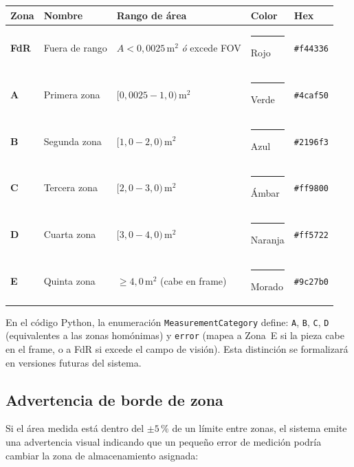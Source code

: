 \documentclass[12pt, a4paper]{article}
\begin{document}
\vspace{0.5cm}
\begin{center}
\begin{tabular}{p{1.1cm} p{2.5cm} p{3.8cm} p{2.4cm} p{1.8cm}}
\toprule
\textbf{Zona} & \textbf{Nombre} & \textbf{Rango de área} & \textbf{Color} & \textbf{Hex} \\
\midrule
\textbf{FdR} & Fuera de rango &
  $A < 0{,}0025\,\text{m}^2$ \textit{ó} excede FOV &
  \textcolor{catOut}{\rule{1.2cm}{0.25cm}} Rojo & \texttt{\#f44336} \\[3pt]
\textbf{A} & Primera zona &
  $[0{,}0025 - 1{,}0)\,\text{m}^2$ &
  \textcolor{catA}{\rule{1.2cm}{0.25cm}} Verde & \texttt{\#4caf50} \\[3pt]
\textbf{B} & Segunda zona &
  $[1{,}0 - 2{,}0)\,\text{m}^2$ &
  \textcolor{catB}{\rule{1.2cm}{0.25cm}} Azul & \texttt{\#2196f3} \\[3pt]
\textbf{C} & Tercera zona &
  $[2{,}0 - 3{,}0)\,\text{m}^2$ &
  \textcolor{catC}{\rule{1.2cm}{0.25cm}} \'{A}mbar & \texttt{\#ff9800} \\[3pt]
\textbf{D} & Cuarta zona &
  $[3{,}0 - 4{,}0)\,\text{m}^2$ &
  \textcolor{catD}{\rule{1.2cm}{0.25cm}} Naranja & \texttt{\#ff5722} \\[3pt]
\textbf{E} & Quinta zona &
  $\geq 4{,}0\,\text{m}^2$ (cabe en frame) &
  \textcolor{catE}{\rule{1.2cm}{0.25cm}} Morado & \texttt{\#9c27b0} \\
\bottomrule
\end{tabular}
\end{center}

\begin{notebox}[title={Mapeo con el código fuente --- MeasurementCategory}]
En el código Python, la enumeración \texttt{MeasurementCategory} define:
\texttt{A}, \texttt{B}, \texttt{C}, \texttt{D} (equivalentes a las zonas
homónimas) y \texttt{error} (mapea a Zona~E si la pieza cabe en el frame,
o a FdR si excede el campo de visión). Esta distinción se formalizará en
versiones futuras del sistema.
\end{notebox}

\subsection{Advertencia de borde de zona}

Si el área medida está dentro del $\pm5\,\%$ de un límite entre zonas,
el sistema emite una advertencia visual indicando que un pequeño error de
medición podría cambiar la zona de almacenamiento asignada:
\end{document}
